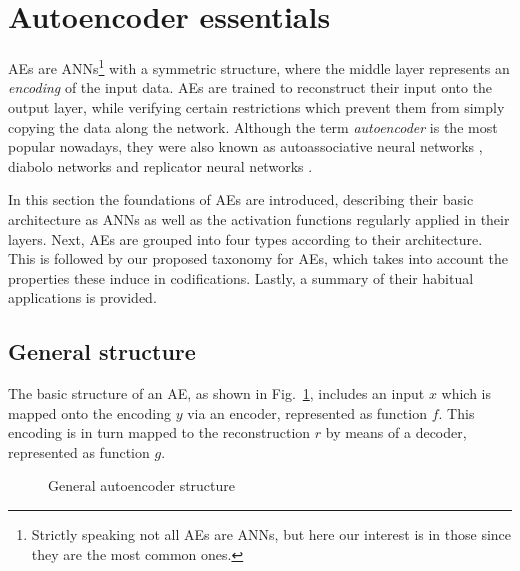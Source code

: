 \section{Autoencoder essentials}\label{p1Sec.Essentials} 


AEs are ANNs\footnote{Strictly speaking not all AEs are ANNs, but here our interest is in those since they are the most common ones.} with a symmetric structure, where the middle layer represents an \textit{encoding} of the input data. AEs are trained to reconstruct their input onto the output layer, while verifying certain restrictions which prevent them from simply copying the data along the network. Although the term \textit{autoencoder} is the most popular nowadays, they were also known as autoassociative neural networks , diabolo networks  and replicator neural networks .

In this section the foundations of AEs are introduced, describing their basic architecture as ANNs as well as the activation functions regularly applied in their layers. Next, AEs are grouped into four types according to their architecture. This is followed by our proposed taxonomy for AEs, which takes into account the properties these induce in codifications. Lastly, a summary of their habitual applications is provided.

\subsection{General structure}
The basic structure of an AE, as shown in Fig.~\ref{p1fig:structure}, includes an input $x$ which is mapped onto the encoding $y$ via an encoder, represented as function $f$. This encoding is in turn mapped to the reconstruction $r$ by means of a decoder, represented as function $g$.

\begin{figure}[ht!]
\begin{center}
\end{center}
  \caption{General autoencoder structure}
  \label{p1fig:structure}
\end{figure}

